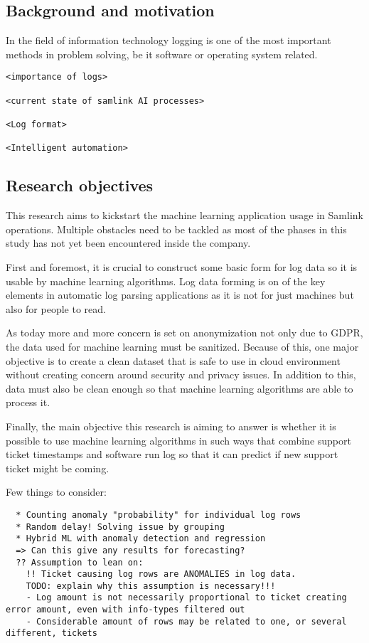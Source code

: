 \documentclass[english, 12pt, a4paper, elec, utf8, a-1b, online]{aaltothesis}
\begin{document}
\subsection{Background and motivation}\label{subsec:background-and-motivation}
In the field of information technology
logging is one of the most important methods
in problem solving,
be it software or operating system related.\cite{delarosa2018log}

\begin{verbatim}
<importance of logs>

<current state of samlink AI processes>

<Log format>

<Intelligent automation>
\end{verbatim}

\subsection{Research objectives}\label{subsec:research-objectives}
This research aims to kickstart the machine learning application usage in Samlink operations.
Multiple obstacles need to be tackled
as most of the phases in this study has not yet been encountered inside the company.

First and foremost,
it is crucial to construct some basic form for log data
so it is usable by machine learning algorithms.
Log data forming is on of the key elements in automatic log parsing applications
as it is not for just machines
but also for people to read.

As today more and more concern is set on anonymization
not only due to GDPR,
the data used for machine learning must be sanitized.
Because of this,
one major objective is to create a clean dataset
that is safe to use in cloud environment
without creating concern around security and privacy issues.
In addition to this,
data must also be clean enough
so that machine learning algorithms
are able to process it.

Finally,
the main objective this research is aiming to answer
is whether it is possible to use machine learning algorithms
in such ways that combine support ticket timestamps
and software run log
so that it can predict
if new support ticket might be coming.

Few things to consider:
\begin{verbatim}
  * Counting anomaly "probability" for individual log rows
  * Random delay! Solving issue by grouping
  * Hybrid ML with anomaly detection and regression
  => Can this give any results for forecasting?
  ?? Assumption to lean on:
    !! Ticket causing log rows are ANOMALIES in log data.
    TODO: explain why this assumption is necessary!!!
    - Log amount is not necessarily proportional to ticket creating error amount, even with info-types filtered out
    - Considerable amount of rows may be related to one, or several different, tickets
\end{verbatim}
\end{document}
